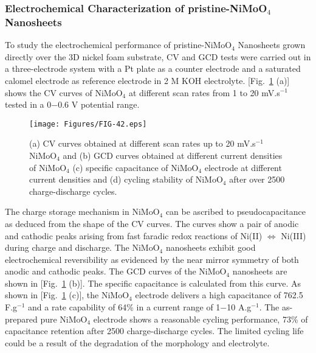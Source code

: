 \documentclass[reprint,amsmath,amssymb,aps,floatfix,
]{revtex4-2}
\begin{document}
\subsubsection{Electrochemical Characterization of pristine-NiMoO$_4$ Nanosheets}
To study the electrochemical performance of pristine-NiMoO$_4$ Nanosheets grown directly over the 3D nickel foam substrate, CV and GCD tests were carried out in a three-electrode system with a Pt plate as a counter electrode and a saturated calomel electrode as reference electrode in 2 M KOH electrolyte. [Fig.~\ref{fig:fig42} (a)] shows the CV curves of NiMoO$_4$ at different scan rates from 1 to 20 mV.s$^{-1}$ tested in a 0$-$0.6 V potential range.
\begin{figure}[b]
    \centering
    \texttt{[image: Figures/FIG-42.eps]}
    \caption{\label{fig:fig42}(a) CV curves obtained at different scan rates up to 20 mV.s$^{-1}$ NiMoO$_4$ and (b) GCD curves obtained at different current densities of NiMoO$_4$ (c) specific capacitance of NiMoO$_4$ electrode at different current densities and (d) cycling stability of NiMoO$_4$ after over 2500 charge-discharge cycles.}
    \end{figure}
The charge storage mechanism in NiMoO$_4$ can be ascribed to pseudocapacitance as deduced from the shape of the CV curves. The curves show a pair of anodic and cathodic peaks arising from fast faradic redox reactions of Ni(II) $\Leftrightarrow$ Ni(III) during charge and discharge. The NiMoO$_4$ nanosheets exhibit good electrochemical reversibility as evidenced by the near mirror symmetry of both anodic and cathodic peaks. The GCD curves of the NiMoO$_4$ nanosheets are shown in [Fig.~\ref{fig:fig42} (b)]. The specific capacitance is calculated from this curve. As shown in [Fig.~\ref{fig:fig42} (c)], the NiMoO$_4$ electrode delivers a high capacitance of 762.5 F.g$^{-1}$ and a rate capability of 64\% in a current range of 1$-$10 A.g$^{-1}$. The as-prepared pure NiMoO$_4$ electrode shows a reasonable cycling performance, 73\% of capacitance retention after 2500 charge-discharge cycles. The limited cycling life could be a result of the degradation of the morphology and electrolyte.
\end{document}
